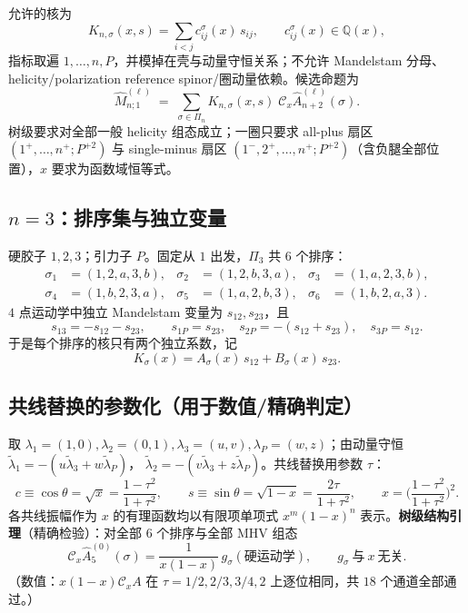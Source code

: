 \documentclass[11pt]{article}
\newcommand{\Cx}{\mathcal{C}_x}
\newcommand{\Mhat}{\widehat{M}}
\newcommand{\Ahat}{\widehat{A}}
\newcommand{\Pt}{P}
\begin{document}
允许的核为
\begin{equation}
K_{n,\sigma}(x,s)=\sum_{i<j}c^{\sigma}_{ij}(x)\,s_{ij},\qquad c^\sigma_{ij}(x)\in\mathbb{Q}(x),
\label{eq:kernel}
\end{equation}
指标取遍 $1,\dots,n,\Pt$，并模掉在壳与动量守恒关系；不允许 Mandelstam 分母、helicity/polarization reference spinor/圈动量依赖。候选命题为
\begin{equation}
\Mhat^{(\ell)}_{n;1}\;=\;\sum_{\sigma\in\Pi_n}K_{n,\sigma}(x,s)\;\Cx\Ahat^{(\ell)}_{n+2}(\sigma).
\tag{Q1}
\end{equation}
树级要求对全部一般 helicity 组态成立；一圈只要求
all-plus 扇区 $(1^+,\dots,n^+;\Pt^{+2})$ 与 single-minus 扇区 $(1^-,2^+,\dots,n^+;\Pt^{+2})$（含负腿全部位置），$x$ 要求为函数域恒等式。

\subsection{$n=3$：排序集与独立变量}
\label{sec:n3}
硬胶子 $1,2,3$；引力子 $\Pt$。固定从 $1$ 出发，$\Pi_3$ 共 $6$ 个排序：
\begin{equation}
\begin{aligned}
\sigma_1&=(1,2,a,3,b),&\sigma_2&=(1,2,b,3,a),&\sigma_3&=(1,a,2,3,b),\\
\sigma_4&=(1,b,2,3,a),&\sigma_5&=(1,a,2,b,3),&\sigma_6&=(1,b,2,a,3).
\end{aligned}
\label{eq:Pi3}
\end{equation}
$4$ 点运动学中独立 Mandelstam 变量为 $s_{12},s_{23}$，且
\begin{equation}
s_{13}=-s_{12}-s_{23},\qquad s_{1\Pt}=s_{23},\quad s_{2\Pt}=-(s_{12}+s_{23}),\quad s_{3\Pt}=s_{12}.
\label{eq:mandel}
\end{equation}
于是每个排序的核只有两个独立系数，记
\begin{equation}
K_\sigma(x)=A_\sigma(x)\,s_{12}+B_\sigma(x)\,s_{23}.
\label{eq:kernel2var}
\end{equation}

\subsection{共线替换的参数化（用于数值/精确判定）}
取 $\lambda_1=(1,0),\lambda_2=(0,1),\lambda_3=(u,v),\lambda_\Pt=(w,z)$；由动量守恒
$\widetilde\lambda_1=-(u\widetilde\lambda_3+w\widetilde\lambda_\Pt)$，
$\widetilde\lambda_2=-(v\widetilde\lambda_3+z\widetilde\lambda_\Pt)$。共线替换用参数 $\tau$：
\begin{equation}
c\equiv\cos\theta=\sqrt x=\frac{1-\tau^2}{1+\tau^2},\qquad s\equiv\sin\theta=\sqrt{1-x}=\frac{2\tau}{1+\tau^2},
\qquad x=\Big(\frac{1-\tau^2}{1+\tau^2}\Big)^2.
\label{eq:tau}
\end{equation}
各共线振幅作为 $x$ 的有理函数均以有限项单项式 $x^m(1-x)^n$ 表示。\textbf{树级结构引理}（精确检验）：对全部 $6$ 个排序与全部 MHV 组态
\begin{equation}
\Cx\Ahat^{(0)}_5(\sigma)=\frac{1}{x(1-x)}\,g_\sigma(\text{硬运动学}),\qquad g_\sigma\ \text{与}\ x\ \text{无关}.
\label{eq:xstrutree}
\end{equation}
（数值：$x(1-x)\Cx A$ 在 $\tau=1/2,2/3,3/4,2$ 上逐位相同，共 $18$ 个通道全部通过。）
\end{document}
